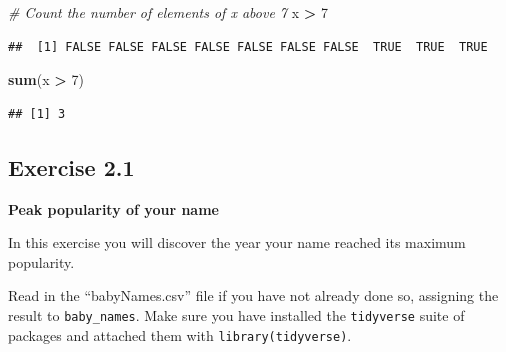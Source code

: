 \documentclass[
]{book}
\newenvironment{Shaded}{\begin{snugshade}}{\end{snugshade}}
\newcommand{\CommentTok}[1]{\textcolor[rgb]{0.56,0.35,0.01}{\textit{#1}}}
\newcommand{\DecValTok}[1]{\textcolor[rgb]{0.00,0.00,0.81}{#1}}
\newcommand{\KeywordTok}[1]{\textcolor[rgb]{0.13,0.29,0.53}{\textbf{#1}}}
\newcommand{\NormalTok}[1]{#1}
\newcommand{\OperatorTok}[1]{\textcolor[rgb]{0.81,0.36,0.00}{\textbf{#1}}}
\newcommand{\StringTok}[1]{\textcolor[rgb]{0.31,0.60,0.02}{#1}}
\begin{document}
\begin{Shaded}
\begin{Highlighting}[]
\CommentTok{\# Count the number of elements of x above 7}
\NormalTok{x }\OperatorTok{\textgreater{}}\StringTok{ }\DecValTok{7}
\end{Highlighting}
\end{Shaded}

\begin{verbatim}
##  [1] FALSE FALSE FALSE FALSE FALSE FALSE FALSE  TRUE  TRUE  TRUE
\end{verbatim}

\begin{Shaded}
\begin{Highlighting}[]
\KeywordTok{sum}\NormalTok{(x }\OperatorTok{\textgreater{}}\StringTok{ }\DecValTok{7}\NormalTok{)}
\end{Highlighting}
\end{Shaded}

\begin{verbatim}
## [1] 3
\end{verbatim}

\hypertarget{exercise-2.1}{%
\subsection{Exercise 2.1}\label{exercise-2.1}}

\textbf{Peak popularity of your name}

In this exercise you will discover the year your name reached its maximum popularity.

Read in the ``babyNames.csv'' file if you have not already done so,
assigning the result to \texttt{baby\_names}. Make sure you have installed
the \texttt{tidyverse} suite of packages and attached them with \texttt{library(tidyverse)}.
\end{document}
